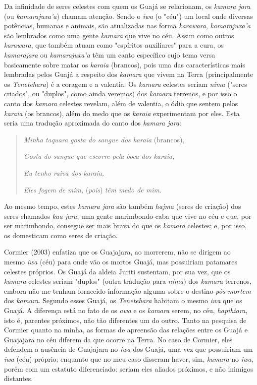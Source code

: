 Da infinidade de seres celestes com quem os Guajá se relacionam, os
\emph{kamara jara} (ou \emph{kamarajuxa'a}) chamam atenção. Sendo o
\emph{iwa} (o "céu") um local onde diversas potências, humanas e
animais, são atualizadas nas forma \emph{karawara}, \emph{kamarajuxa'a}
são lembrados como uma gente \emph{kamara} que vive no céu. Assim como
outros \emph{karawara}, que também atuam como "espíritos auxiliares"
para a cura, os \emph{kamarajara} ou \emph{kamarajuxa'a} têm um canto
específico cujo tema versa basicamente sobre matar os \emph{karaia}
(brancos), pois uma das características mais lembradas pelos Guajá a
respeito dos \emph{kamara} que vivem na Terra (principalmente os
\emph{Tenetehara}) é a coragem e a valentia. Os \emph{kamara} celestes
seriam \emph{nima} ("seres criados", ou "duplos", como ainda veremos)
dos \emph{kamara} terrenos, e por isso o canto dos \emph{kamara}
celestes revelam, além de valentia, o ódio que sentem pelos
\emph{karaia} (os brancos), além do medo que os \emph{karaia}
experimentam por eles. Esta seria uma tradução aproximada do canto dos
\emph{kamara jara}:

\begin{quote}
\emph{Minha taquara gosta do sangue dos karaia} (brancos)\emph{,}

\emph{Gosta do sangue que escorre pela boca dos karaia,}

\emph{Eu tenho raiva dos karaia,}

\emph{Eles fogem de mim,} (\emph{pois}) \emph{têm medo de mim.}
\end{quote}

Ao mesmo tempo, estes \emph{kamara jara} são também \emph{hajma} (seres
de criação) dos seres chamados \emph{kaa jara}, uma gente
marimbondo-caba que vive no céu e que, por ser marimbondo, consegue ser
mais brava do que os \emph{kamara} celestes; e, por isso, os domesticam
como seres de criação.

Cormier (2003) enfatiza que os Guajajara, ao morrerem, não se dirigem ao
mesmo \emph{iwa} (céu) para onde vão os mortos Guajá, mas possuiriam
patamares celestes próprios. Os Guajá da aldeia Juriti sustentam, por
sua vez, que os \emph{kamara} celestes seriam "duplos" (outra tradução
para \emph{nima}) dos \emph{kamara} terrenos, embora não me tenham
fornecido informação alguma sobre o destino \emph{pós-mortem} dos
\emph{kamara}. Segundo esses Guajá, os \emph{Tenetehara} habitam o mesmo
\emph{iwa} que os Guajá. A diferença está no fato de os \emph{awa} e os
\emph{kamara} serem, no céu, \emph{hapihiara}, isto é, parentes
próximos, não tão diferentes um do outro. Tanto na pesquisa de Cormier
quanto na minha, as formas de apreensão das relações entre os Guajá e
Guajajara no céu diferem da que ocorre na Terra. No caso de Cormier,
eles defendem a ausência de Guajajara no \emph{iwa} dos Guajá, uma vez
que possuiriam um \emph{iwa} (céu) próprio; enquanto que no meu caso
disseram haver, sim, \emph{kamara} no \emph{iwa}, porém com um estatuto
diferenciado: seriam eles aliados próximos, e não inimigos distantes.

